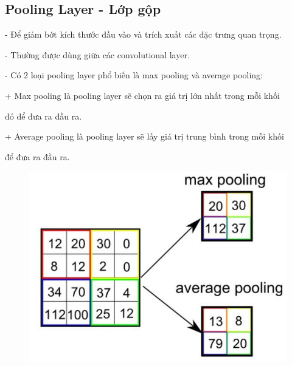\documentclass[12pt, a4paper]{article}
\begin{document}
\subsection{Pooling Layer - Lớp gộp}
\par \hspace{1cm}- Để giảm bớt kích thước đầu vào và trích xuất các đặc trưng quan trọng.
\par \hspace{1cm}- Thường được dùng giữa các convolutional layer.
\par \hspace{1cm}- Có 2 loại pooling layer phổ biến là max pooling và average pooling:
\par \hspace{2cm}+ Max pooling là pooling layer sẽ chọn ra giá trị lớn nhất trong mỗi khối \par \hspace{2.4cm}đó để đưa ra đầu ra.
\par \hspace{2cm}+ Average pooling là pooling layer sẽ lấy giá trị trung bình trong mỗi khối
\par \hspace{2.4cm}để đưa ra đầu ra.


\begin{figure}[h] %
    \centering
    \includegraphics[scale = 0.4]{Img/pool.png}
\end{figure}
\end{document}
